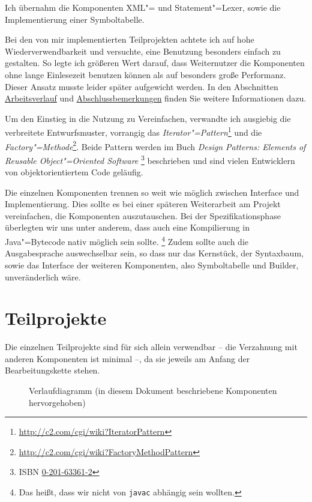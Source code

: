 \documentclass[10pt,a4paper,ngerman,titlepage,tocindentauto]{scrartcl}
\newcommand{\link}[1]{\href{#1}{#1}}
\newcommand{\fnlink}[1]{\footnote{\link{#1}}}
\begin{document}
		Ich übernahm die Komponenten XML"= und Statement"=Lexer, sowie die Implementierung einer Symboltabelle.
		
		Bei den von mir implementierten Teilprojekten achtete ich auf hohe Wiederverwendbarkeit
		und versuchte, eine Benutzung besonders einfach zu gestalten. So legte ich größeren Wert darauf,
		dass Weiternutzer die Komponenten ohne lange Einlesezeit benutzen können als auf besonders große
		Performanz. Dieser Ansatz musste leider später aufgewicht werden. In den Abschnitten
		\hyperlink{Arbeitsverlauf}{Arbeitsverlauf} und \hyperlink{Abschlussbemerkungen}{Abschlussbemerkungen}
		finden Sie weitere Informationen dazu.
		
		Um den Einstieg in die Nutzung zu Vereinfachen, verwandte ich ausgiebig die verbreitete Entwurfsmuster,
		vorrangig das {\em Iterator"=Pattern}\fnlink{http://c2.com/cgi/wiki?IteratorPattern} und die
		{\em Factory"=Methode}\fnlink{http://c2.com/cgi/wiki?FactoryMethodPattern}.
		Beide Pattern werden im Buch {\em Design Patterns: Elements of Reusable Object"=Oriented Software}%
		\footnote{ISBN \href{https://portal.d-nb.de/opac.htm?method=simpleSearch&query=0201633612}{0-201-63361-2}}
		beschrieben und sind vielen Entwicklern von objektorientiertem Code geläufig.
		
		Die einzelnen Komponenten trennen so weit wie möglich zwischen Interface und Implementierung.
		Dies sollte es bei einer späteren Weiterarbeit am Projekt vereinfachen, die Komponenten
		auszutauschen. Bei der Spezifikationsphase überlegten wir uns unter anderem, dass auch eine
		Kompilierung in Java"=Bytecode nativ möglich sein sollte.%
		\footnote{Das heißt, dass wir nicht von \texttt{javac} abhängig sein wollten.}
		Zudem sollte auch die Ausgabesprache auswechselbar sein, so dass nur das Kernstück,
		der Syntaxbaum, sowie das Interface der weiteren Komponenten, also Symboltabelle und Builder,
		unveränderlich wäre.
		
	\section{Teilprojekte}
		Die einzelnen Teilprojekte sind für sich allein verwendbar -- die Verzahnung
		mit anderen Komponenten ist minimal --, da sie jeweils am Anfang der Bearbeitungskette stehen.
		
		\begin{figure}[ht]
			\caption[Verlaufdiagramm]
				{\hypertarget{Verlaufdiagramm}{Verlaufdiagramm (in diesem Dokument beschriebene Komponenten hervorgehoben)}}
		\end{figure}
		
\end{document}
